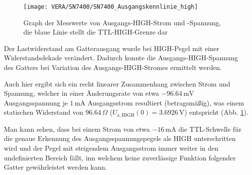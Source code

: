 \begin{figure}[h]
  \begin{center}
    \texttt{[image: VERA/SN7400/SN7400\_Ausgangskennlinie\_high]}
  \end{center}
  \caption{Graph der Messwerte von Ausgangs-HIGH-Strom und -Spannung, die blaue
    Linie stellt die TTL-HIGH-Grenze dar}
  \label{fig:aus_schnib_high}
\end{figure}

Der Lastwiderstand am Gatterausgang wurde bei HIGH-Pegel mit einer
Widerstandsdekade verändert. Dadurch konnte die Ausgangs-HIGH-Spannung des
Gatters bei Variation des Ausgangs-HIGH-Stromes ermittelt werden.


Auch hier
ergibt sich ein recht linearer Zusammenhang zwischen Strom und Spannung, welcher
in einer Änderungsrate von etwa $- 96.64 \, \si{\milli\volt}$ Ausgangsspannung
je $1 \, \si{\milli\ampere}$ Ausgangsstrom resultiert (betragsmäßig), was einem
statischen Widerstand von $96.64 \, \Omega$ ($U_\mathrm{a,HIGH}(0) = 3.6926 \,
\si{\volt}$) entspricht (Abb. \ref{fig:aus_schnib_high}).

Man kann sehen, dass bei einem Strom von etwa $-16
\,\si{\milli\ampere}$ die TTL-Schwelle für die genaue Erkennung des
Ausgangsspannungspegels als HIGH unterschritten wird und der Pegel mit
steigendem Ausgangsstrom immer weiter in den undefinierten Bereich fällt, inn welchem
keine zuverlässige Funktion folgender Gatter gewährleistet werden kann.

